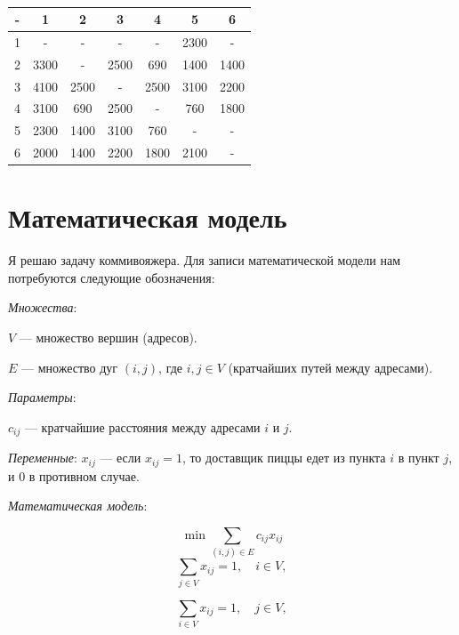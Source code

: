 \documentclass[]{article}
\begin{document}
\begin{table}\caption{}\label{tab:2}
\centering
\begin{tabular}{|c|c|c|c|c|c|c|}
	\hline
- &    1  &   2  &   3  &   4  &   5  &  6  \\
\hline
1 &   -  &  -   &   -  &  -   & 2300 &  -   \\
\hline
2 & 3300 &  -   & 2500 &  690 & 1400 & 1400 \\
\hline
3 & 4100 & 2500 &  -   & 2500 & 3100 & 2200 \\
\hline
4	& 3100 &  690 & 2500 &  -   & 760  & 1800 \\
\hline
5	& 2300 & 1400 & 3100 &  760 &  -   &   -  \\
\hline
6 & 2000 & 1400 & 2200 & 1800 & 2100 &  -   \\
\hline

\hline
\end{tabular}
\end{table}

\section{Математическая модель}




Я решаю задачу коммивояжера.
Для записи математической модели нам потребуются следующие обозначения:
\par
\textit{Множества}:
\par\noindent
$V$ --- множество вершин (адресов).
\par\noindent
$E$ --- множество дуг $(i,j)$, где $i,j\in V$ (кратчайших путей между адресами).
\par
\textit{Параметры}:

$c_{ij}$ --- кратчайшие расстояния между адресами $i$ и $j$.
\par
\textit{Переменные}:
$x_{ij}$ --- если $x_{ij}=1$, то доставщик пиццы
едет из пункта $i$ в пункт $j$, и $0$ в противном случае.
\par
\textit{Математическая модель}:

\par\noindent
\begin{equation}
\min\sum_{(i,j)\in E}c_{ij}x_{ij}
\end{equation}
\begin{equation}\label{eq:2}
	\sum_{j\in V}
			x_{ij} = 1,\quad i\in V,
\end{equation}

\begin{equation}\label{eq:3}
	\sum_{i\in V}
			x_{ij} = 1,\quad j\in V,
\end{equation}
\end{document}
